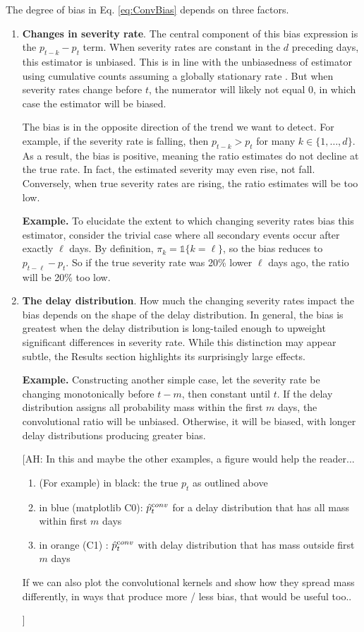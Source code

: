 \documentclass{article}
\newcommand{\ahcomment}[1]{{\color{red}[AH: #1]}}
\begin{document}
The degree of bias in Eq. \ref{eq:ConvBias} depends on three factors.
\begin{enumerate}
    \item \textbf{Changes in severity rate}. The central component of this bias expression is the $p_{t-k}-p_t$ term. When severity rates are constant in the $d$ preceding days, this estimator is unbiased. This is in line with the unbiasedness of estimator using cumulative counts assuming a globally stationary rate \cite{nishiura}. But when severity rates change before $t$, the numerator will likely not equal 0, in which case the estimator will be biased. 

The bias is in the opposite direction of the trend we want to detect. For example, if the severity rate is falling, then $p_{t-k} > p_t$ for many $k\in \{1, \ldots, d\}$. As a result, the bias is positive, meaning the ratio estimates do not decline at the true rate. In fact, the estimated severity may even rise, not fall. Conversely, when true severity rates are rising, the ratio estimates will be too low. %

\textbf{Example.} To elucidate the extent to which changing severity rates bias this estimator, consider the trivial case where all secondary events occur after exactly $\ell$ days. By definition, $\pi_k = \mathds{1}\{k=\ell\}$, so the bias reduces to $p_{t-\ell} - p_t$. So if the true severity rate was 20\% lower $\ell$ days ago, the ratio will be 20\% too low. 
    \item \textbf{The delay distribution}. How much the changing severity rates impact the bias depends on the shape of the delay distribution. In general, the bias is greatest when the delay distribution is long-tailed enough to upweight significant differences in severity rate. While this distinction may appear subtle, the Results section highlights its surprisingly large effects.

\textbf{Example.} Constructing another simple case, let the severity rate be changing monotonically before $t-m$, then constant until $t$. If the delay distribution assigns all probability mass within the first $m$ days, the convolutional ratio will be unbiased. Otherwise, it will be biased, with longer delay distributions producing greater bias. 
\ahcomment{
    In this and maybe the other examples, a figure would help the reader...
    \begin{enumerate}
        \item (For example) in black: the true $p_t$ as outlined
        above
        \item in blue (matplotlib C0): $\hat p_t^{\text conv}$ 
        for a delay distribution that has all mass within first 
        $m$ days
        \item in orange (C1) : $\hat p_t^{\text conv}$ with delay 
        distribution that has mass outside first $m$ days
    \end{enumerate}
    If we can also plot the convolutional kernels and show how 
    they spread mass differently, in ways that produce more / less
    bias, that would be useful too..

}
\end{enumerate}
\end{document}
